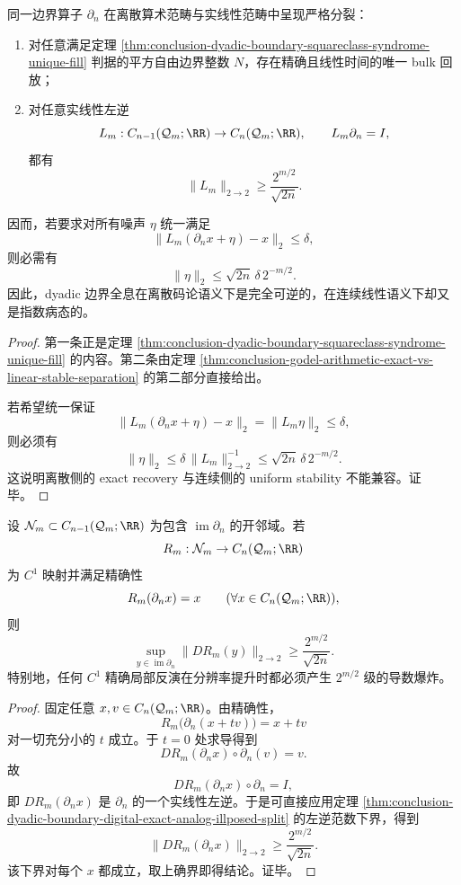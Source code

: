 \begin{theorem}[数字精确性与模拟病态性的严格二歧]\label{thm:conclusion-dyadic-boundary-digital-exact-analog-illposed-split}
同一边界算子 \(\partial_n\) 在离散算术范畴与实线性范畴中呈现严格分裂：
\begin{enumerate}
  \item 对任意满足定理 \ref{thm:conclusion-dyadic-boundary-squareclass-syndrome-unique-fill} 判据的平方自由边界整数 \(N\)，存在精确且线性时间的唯一 bulk 回放；
  \item 对任意实线性左逆
        \[
        L_m:C_{n-1}(\mathcal Q_m;\RR)\to C_n(\mathcal Q_m;\RR),
        \qquad
        L_m\partial_n=I,
        \]
        都有
        \[
        \|L_m\|_{2\to 2}\ge \frac{2^{m/2}}{\sqrt{2n}}.
        \]
\end{enumerate}
因而，若要求对所有噪声 \(\eta\) 统一满足
\[
\|L_m(\partial_n x+\eta)-x\|_2\le \delta,
\]
则必需有
\[
\|\eta\|_2\le \sqrt{2n}\,\delta\,2^{-m/2}.
\]
因此，dyadic 边界全息在离散码论语义下是完全可逆的，在连续线性语义下却又是指数病态的。
\end{theorem}
\begin{proof}
第一条正是定理 \ref{thm:conclusion-dyadic-boundary-squareclass-syndrome-unique-fill} 的内容。第二条由定理 \ref{thm:conclusion-godel-arithmetic-exact-vs-linear-stable-separation} 的第二部分直接给出。

若希望统一保证
\[
\|L_m(\partial_n x+\eta)-x\|_2=\|L_m\eta\|_2\le \delta,
\]
则必须有
\[
\|\eta\|_2\le \delta\,\|L_m\|_{2\to2}^{-1}
\le
\sqrt{2n}\,\delta\,2^{-m/2}.
\]
这说明离散侧的 exact recovery 与连续侧的 uniform stability 不能兼容。证毕。
\end{proof}

\begin{theorem}[任何 \(C^1\) 精确局部反演都必发生导数爆炸]\label{thm:conclusion-dyadic-boundary-c1-local-inverse-derivative-blowup}
设 \(\mathcal N_m\subset C_{n-1}(\mathcal Q_m;\RR)\) 为包含 \(\operatorname{im}\partial_n\) 的开邻域。若
\[
R_m:\mathcal N_m\to C_n(\mathcal Q_m;\RR)
\]
为 \(C^1\) 映射并满足精确性
\[
R_m(\partial_n x)=x
\qquad
(\forall x\in C_n(\mathcal Q_m;\RR)),
\]
则
\[
\sup_{y\in \operatorname{im}\partial_n}\|DR_m(y)\|_{2\to 2}
\ge
\frac{2^{m/2}}{\sqrt{2n}}.
\]
特别地，任何 \(C^1\) 精确局部反演在分辨率提升时都必须产生 \(2^{m/2}\) 级的导数爆炸。
\end{theorem}
\begin{proof}
固定任意 \(x,v\in C_n(\mathcal Q_m;\RR)\)。由精确性，
\[
R_m\bigl(\partial_n(x+tv)\bigr)=x+tv
\]
对一切充分小的 \(t\) 成立。于 \(t=0\) 处求导得到
\[
DR_m(\partial_n x)\circ \partial_n(v)=v.
\]
故
\[
DR_m(\partial_n x)\circ \partial_n=I,
\]
即 \(DR_m(\partial_n x)\) 是 \(\partial_n\) 的一个实线性左逆。于是可直接应用定理 \ref{thm:conclusion-dyadic-boundary-digital-exact-analog-illposed-split} 的左逆范数下界，得到
\[
\|DR_m(\partial_n x)\|_{2\to2}\ge \frac{2^{m/2}}{\sqrt{2n}}.
\]
该下界对每个 \(x\) 都成立，取上确界即得结论。证毕。
\end{proof}

